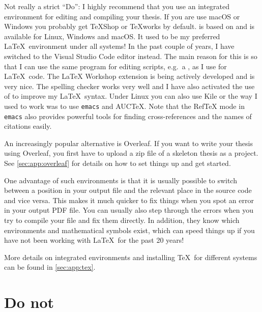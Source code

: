 Not really a strict \enquote{Do}: I highly recommend that you use an
integrated environment for editing and compiling your thesis.
If you are use macOS or Windows you probably get TeXShop or TeXworks by default.
\TeXstudio is based on \TeXmaker and is available for Linux,
Windows and macOS\@.
It used to be my preferred \LaTeX\ environment under all systems!
In the past couple of years,
I have switched to the Visual Studio Code editor instead.
The main reason for this is so that I can use the same program
for editing scripts, e.g.\ a , as I use for \LaTeX\ code.
The \textsf{LaTeX Workshop} extension is being actively developed
and is very nice.
The  spelling checker works very well
and I have also activated the use of  to improve my \LaTeX\ syntax.
Under Linux you can also use Kile or the way I used to work
was to use \texttt{emacs} and AUCTeX.
Note that the RefTeX mode in \texttt{emacs} also provides powerful
tools for finding cross-references and the names of citations easily.

An increasingly popular alternative is Overleaf.
If you want to write your thesis using Overleaf,
you first have to upload a zip file of a skeleton thesis as a project.
See \cref{sec:app:overleaf} for details on how to set things up and get started.
  
One advantage of such environments is that it is usually
possible to switch between a position in your output file
and the relevant place in the source code and vice versa.
This makes it much quicker to fix
things when you spot an error in your output PDF file. You can usually
also step through the errors when you try to compile your file and fix
them directly. In addition, they know which environments and
mathematical symbols exist, which can speed things up if you have not
been working with \LaTeX\ for the past 20 years!

More details on integrated environments and installing \TeX\ for different systems can be found
in \cref{sec:app:tex}.


\section{Do not}%
\label{sec:tips:dont}

